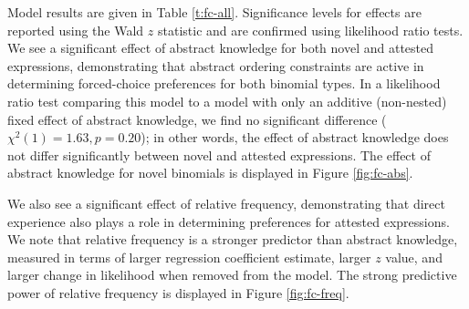 \documentclass[authoryear]{elsarticle}
\begin{document}
Model results are given in Table \ref{t:fc-all}.\footnotemark{} Significance levels for effects are reported using the Wald $z$ statistic and are confirmed using likelihood ratio tests. We see a significant effect of abstract knowledge for both novel and attested expressions, demonstrating that abstract ordering constraints are active in determining forced-choice preferences for both binomial types. In a likelihood ratio test comparing this model to a model with only an additive (non-nested) fixed effect of abstract knowledge, we find no significant difference ($\chi^{2}(1)=1.63, p=0.20$); in other words, the effect of abstract knowledge does not differ significantly between novel and attested expressions. The effect of abstract knowledge for novel binomials is displayed in Figure \ref{fig:fc-abs}.


We also see a significant effect of relative frequency, demonstrating that direct experience also plays a role in determining preferences for attested expressions. We note that relative frequency is a stronger predictor than abstract knowledge, measured in terms of larger regression coefficient estimate, larger $z$ value, and larger change in likelihood when removed from the model. The strong predictive power of relative frequency is displayed in Figure \ref{fig:fc-freq}. 
\end{document}
